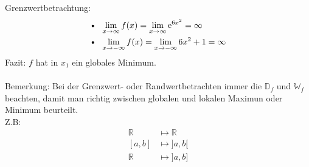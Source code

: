 Grenzwertbetrachtung:\\
\begin{align*}
&\text{\textbullet} \;\;\lim\limits_ {x\to\infty}f(x)=\lim\limits_ {x\to\infty}\mathrm{e}^{6x^2}=\infty\\
&\text{\textbullet }\;\;\lim\limits_ {x\to -\infty}f(x)=\lim\limits_ {x\to -\infty}6x^2+1=\infty\\
\end{align*}
Fazit: 
$ f $ hat in $ x_1 $ ein globales Minimum.
\\
\\
Bemerkung:
Bei der Grenzwert- oder Randwertbetrachten immer die $ \mathbb{D}_f $ und $ \mathbb{W}_f $ beachten, damit man richtig zwischen globalen und lokalen Maximun oder Minimum beurteilt.\\
Z.B:
\begin{align*}
\mathbb{R}&\longmapsto \mathbb{R}\\
[a,b]&\longmapsto ]a,b[\\
\mathbb{R}&\longmapsto ]a,b]\\
\end{align*}



